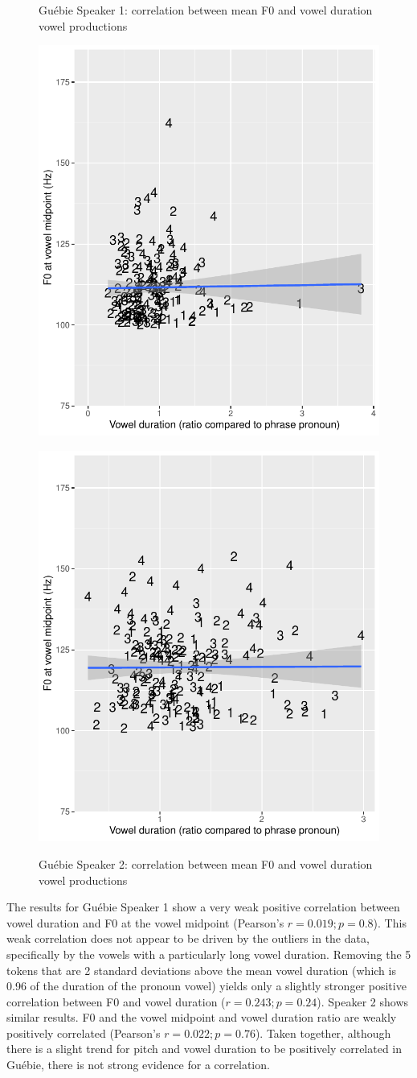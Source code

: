 \documentclass[output=paper]{langscibook}
\begin{document}
\begin{figure}
\begin{floatrow}
 \captionsetup{margin=.05\linewidth}
 \ffigbox
 {\caption{Guébie Speaker 1: correlation between mean F0 and vowel duration vowel productions\label{fig:oakley:olivierPitchDurationCorrelation}}}
 {\includegraphics[width=.5\textwidth]{figures/olivierPitchDurationCorrelationScatter.pdf}}%
 \ffigbox
 {\caption{Guébie Speaker 2: correlation between mean F0 and vowel duration vowel productions\label{fig:oakley:borisPitchDurationCorr}}}
 {\includegraphics[width=.5\textwidth]{figures/borisPitchDurationCorrScatter.pdf}}
\end{floatrow}
\end{figure}
   
The results for Guébie Speaker 1 show a very weak positive correlation between vowel duration and F0 at the vowel midpoint (Pearson's $r=0.019; p=0.8$). This weak correlation does not appear to be driven by the outliers in the data, specifically by the vowels with a particularly long vowel duration. Removing the 5 tokens that are 2 standard deviations above the mean vowel duration (which is 0.96 of the duration of the pronoun vowel) yields only a slightly stronger positive correlation between F0 and vowel duration ($r=0.243; p=0.24$). Speaker 2 shows similar results. F0 and the vowel midpoint and vowel duration ratio are weakly positively correlated (Pearson's $r=0.022; p=0.76$). Taken together, although there is a slight trend for pitch and vowel duration to be positively correlated in Guébie, there is not strong evidence for a correlation.
\end{document}
